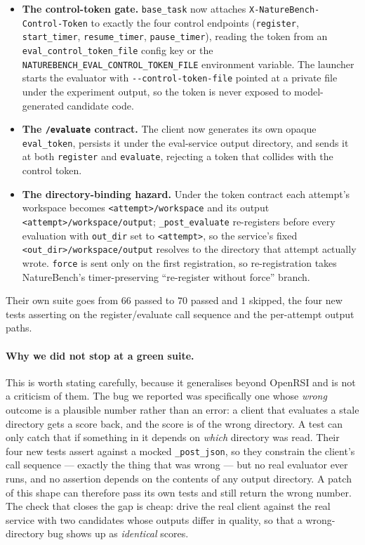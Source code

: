 \begin{itemize}
\item \textbf{The control-token gate.} \texttt{base\_task} now attaches
  \texttt{X-NatureBench-Control-Token} to exactly the four control endpoints
  (\texttt{register}, \texttt{start\_timer}, \texttt{resume\_timer}, \texttt{pause\_timer}),
  reading the token from an \texttt{eval\_control\_token\_file} config key or the
  \texttt{NATUREBENCH\_EVAL\_CONTROL\_TOKEN\_FILE} environment variable. The launcher starts
  the evaluator with \texttt{-{}-control-token-file} pointed at a private file under the
  experiment output, so the token is never exposed to model-generated candidate code.
\item \textbf{The \texttt{/evaluate} contract.} The client now generates its own opaque
  \texttt{eval\_token}, persists it under the eval-service output directory, and sends it at
  both \texttt{register} and \texttt{evaluate}, rejecting a token that collides with the
  control token.
\item \textbf{The directory-binding hazard.} Under the token contract each attempt's
  workspace becomes \texttt{<attempt>/workspace} and its output
  \texttt{<attempt>/workspace/output}; \texttt{\_post\_evaluate} re-registers before every
  evaluation with \texttt{out\_dir} set to \texttt{<attempt>}, so the service's fixed
  \texttt{<out\_dir>/workspace/output} resolves to the directory that attempt actually wrote.
  \texttt{force} is sent only on the first registration, so re-registration takes
  NatureBench's timer-preserving ``re-register without force'' branch.
\end{itemize}

Their own suite goes from $66$ passed to $70$ passed and $1$ skipped, the four new tests
asserting on the register/evaluate call sequence and the per-attempt output paths.

\paragraph{Why we did not stop at a green suite.}
This is worth stating carefully, because it generalises beyond OpenRSI and is not a criticism
of them. The bug we reported was specifically one whose \emph{wrong} outcome is a plausible
number rather than an error: a client that evaluates a stale directory gets a score back, and
the score is of the wrong directory. A test can only catch that if something in it depends on
\emph{which} directory was read. Their four new tests assert against a mocked
\texttt{\_post\_json}, so they constrain the client's call sequence --- exactly the thing that
was wrong --- but no real evaluator ever runs, and no assertion depends on the contents of any
output directory. A patch of this shape can therefore pass its own tests and still return the
wrong number. The check that closes the gap is cheap: drive the real client against the real
service with two candidates whose outputs differ in quality, so that a wrong-directory bug
shows up as \emph{identical} scores.

